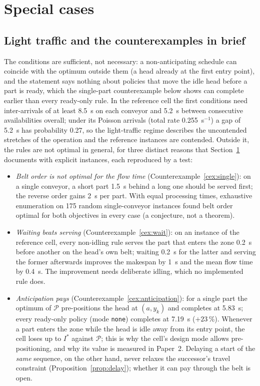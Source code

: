 \documentclass[11pt,a4paper]{article}
\theoremstyle{plain}
\theoremstyle{definition}
\theoremstyle{remark}
\newcommand{\Pb}{\mathcal{P}}
\begin{document}
\section{Special cases}\label{app:special}
\subsection{Light traffic and the counterexamples in brief}
The conditions are sufficient, not necessary: a non-anticipating schedule can coincide
with the optimum outside them (a head already at the first entry point), and the
statement says nothing about policies that move the idle head before a part is ready,
which the single-part counterexample below shows can complete earlier than every
ready-only rule.
In the reference cell the first conditions need inter-arrivals of at least 8.5~s on each
conveyor and 5.2~s between consecutive availabilities overall; under its Poisson arrivals
(total rate 0.255~s$^{-1}$) a gap of 5.2~s has probability 0.27, so the light-traffic
regime describes the uncontended stretches of the operation and the reference instances
are contended. Outside it, the rules are not optimal in general, for three distinct reasons that
Section~\ref{app:special} documents with explicit instances, each reproduced by a test:
\begin{itemize}[nosep]
\item \emph{Belt order is not optimal for the flow time} (Counterexample~\ref{cex:single}):
  on a single conveyor, a short part 1.5~s behind a long one should be served first; the
  reverse order gains 2~s per part. With equal processing times, exhaustive enumeration
  on 175 random single-conveyor instances found belt order optimal for both objectives in
  every case (a conjecture, not a theorem).
\item \emph{Waiting beats serving} (Counterexample~\ref{cex:wait}): on an instance of the
  reference cell, every non-idling rule serves the part that enters the zone 0.2~s before
  another on the head's own belt; waiting 0.2~s for the latter and serving the former
  afterwards improves the makespan by 1~s and the mean flow time by 0.4~s. The
  improvement needs deliberate idling, which no implemented rule does.
\item \emph{Anticipation pays} (Counterexample~\ref{cex:anticipation}): for a single part
  the optimum of $\Pb$ pre-positions the head at $(a,y_k)$ and completes at 5.83~s; every
  ready-only policy (mode \texttt{none}) completes at 7.19~s ($+23$\,\%). Whenever a part enters the zone
  while the head is idle away from its entry point, the cell loses up to $I^\ast$ against
  $\Pb$; this is why the cell's design mode allows pre-positioning, and why its value is
  measured in Paper~2. Delaying a start of the \emph{same} sequence, on the other hand,
  never relaxes the successor's travel constraint (Proposition~\ref{prop:delay}); whether
  it can pay through the belt is open.
\end{itemize}
\end{document}
